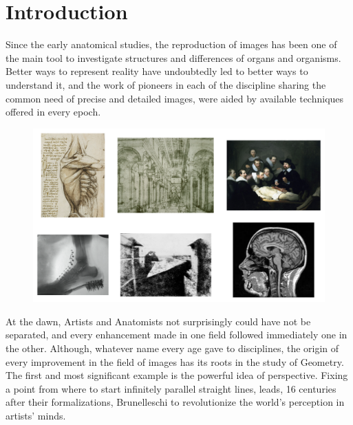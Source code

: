 
\qquad
\pagestyle{empty}
\newpage


\chapter*{Introduction}


Since the early anatomical studies, the reproduction of images has been one of the main tool to investigate structures and differences of organs and organisms. 
Better ways to represent reality have undoubtedly led to better ways to understand it, and the work of pioneers in each of the discipline sharing the common need of precise and detailed images, were aided by available techniques offered in every epoch. 
\begin{figure}[!ht]
	\centering
	\includegraphics[scale=0.35]{figures/image_evolution.png}
	\label{fig:evolution}
\end{figure}  
At the dawn, Artists and Anatomists not surprisingly could have not be separated, and every enhancement made in one field followed immediately one in the other.
Although, whatever name every age gave to disciplines, the origin of every improvement in the field of images has its roots in the study of Geometry.\\
The first and most significant example is the powerful idea of perspective. Fixing a point from where to start infinitely parallel straight lines, leads, 16 centuries after their formalizations, Brunelleschi to revolutionize the  world's perception in artists' minds.
